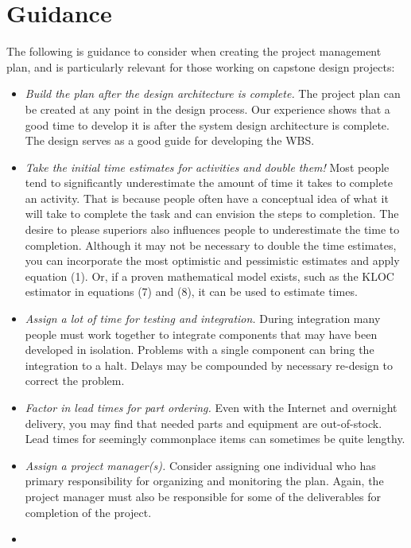 \section{Guidance}
\label{section:guidance}

The following is guidance to consider when creating the project
management plan, and is particularly relevant for those working on
capstone design projects:

\begin{itemize}
\item
  \emph{Build the plan after the design architecture is complete.} The
  project plan can be created at any point in the design process. Our
  experience shows that a good time to develop it is after the system
  design architecture is complete. The design serves as a good guide for
  developing the WBS.
\item
  \emph{Take the initial time estimates for activities and double them!}
  Most people tend to significantly underestimate the amount of time it
  takes to complete an activity. That is because people often have a
  conceptual idea of what it will take to complete the task and can
  envision the steps to completion. The desire to please superiors also
  influences people to underestimate the time to completion. Although it
  may not be necessary to double the time estimates, you can incorporate
  the most optimistic and pessimistic estimates and apply equation (1).
  Or, if a proven mathematical model exists, such as the KLOC estimator
  in equations (7) and (8), it can be used to estimate times.
\item
  \emph{Assign a lot of time for testing and integration.} During
  integration many people must work together to integrate components
  that may have been developed in isolation. Problems with a single
  component can bring the integration to a halt. Delays may be
  compounded by necessary re-design to correct the problem.
\item
  \emph{Factor in lead times for part ordering.} Even with the Internet
  and overnight delivery, you may find that needed parts and equipment
  are out-of-stock. Lead times for seemingly commonplace items can
  sometimes be quite lengthy.
\item
  \emph{Assign a project manager(s).} Consider assigning one individual
  who has primary responsibility for organizing and monitoring the plan.
  Again, the project manager must also be responsible for some of the
  deliverables for completion of the project.
\item

\end{itemize}
